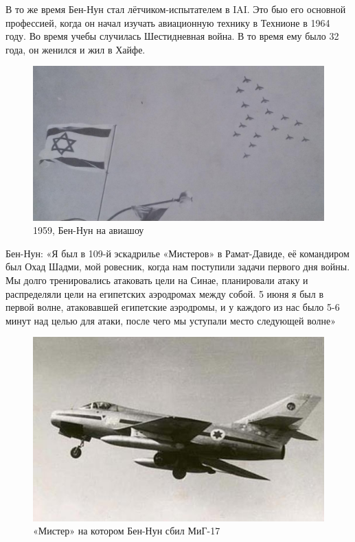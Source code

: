 В то же время Бен-Нун стал лётчиком-испытателем в IAI. Это быо его основной профессией, когда он начал изучать авиационную технику в Технионе в 1964 году. Во время учебы случилась Шестидневная война. В то время ему было 32 года, он женился и жил в Хайфе.

\begin{figure}[h!tb] 
	\centering\includegraphics[scale=0.4]{History_BenNun/SFrAwIWTjoA.jpg}
	\caption{1959, Бен-Нун на авиашоу}%
\end{figure}

Бен-Нун: «Я был в 109-й эскадрилье «Мистеров» в Рамат-Давиде, её командиром был Охад Шадми, мой ровесник, когда нам поступили задачи первого дня войны. Мы долго тренировались атаковать цели на Синае, планировали атаку и распределяли цели на египетских аэродромах между собой. 5 июня я был в первой волне, атаковавшей египетские аэродромы, и у каждого из нас было 5-6 минут над целью для атаки, после чего мы уступали место следующей волне»

\begin{figure}[h!tb] 
	\centering\includegraphics[scale=0.8]{History_BenNun/VsBbAb7luwA.jpg}
	\caption{«Мистер» на котором Бен-Нун сбил МиГ-17}%
\end{figure}


